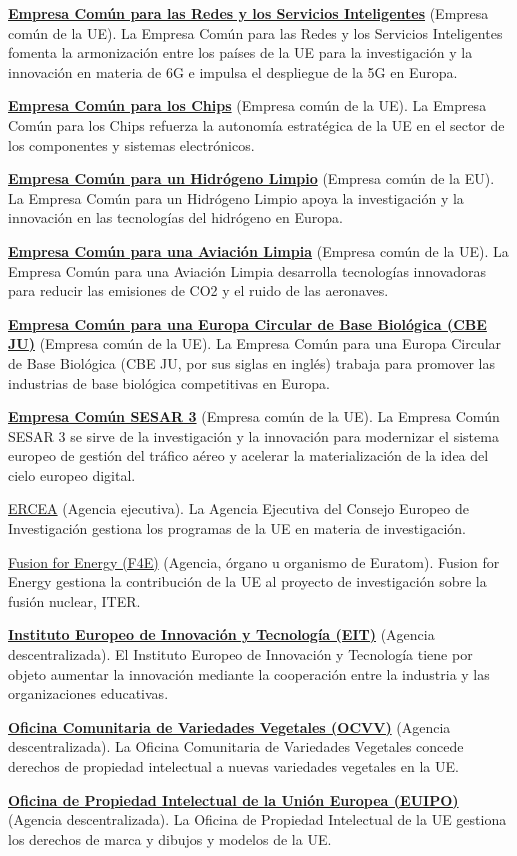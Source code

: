 \documentclass[10pt,a4paper]{article}
\begin{document}
\href{https://smart-networks.europa.eu/}{\textbf{Empresa Común para las Redes y los Servicios Inteligentes}} (Empresa común de la UE). La Empresa Común para las Redes y los Servicios Inteligentes fomenta la armonización entre los países de la UE para la investigación y la innovación en materia de 6G e impulsa el despliegue de la 5G en Europa.

\href{https://www.chips-ju.europa.eu/}{\textbf{Empresa Común para los Chips}} (Empresa común de la UE). La Empresa Común para los Chips refuerza la autonomía estratégica de la UE en el sector de los componentes y sistemas electrónicos.

\href{https://www.clean-hydrogen.europa.eu/index_en}{\textbf{Empresa Común para un Hidrógeno Limpio}} (Empresa común de la EU). La Empresa Común para un Hidrógeno Limpio apoya la investigación y la innovación en las tecnologías del hidrógeno en Europa.

\href{https://www.clean-aviation.eu/}{\textbf{Empresa Común para una Aviación Limpia}} (Empresa común de la UE). La Empresa Común para una Aviación Limpia desarrolla tecnologías innovadoras para reducir las emisiones de CO2 y el ruido de las aeronaves.

\href{https://www.cbe.europa.eu}{\textbf{Empresa Común para una Europa Circular de Base Biológica (CBE JU)}} (Empresa común de la UE). La Empresa Común para una Europa Circular de Base Biológica (CBE JU, por sus siglas en inglés) trabaja para promover las industrias de base biológica competitivas en Europa.

\href{https://www.sesarju.eu/}{\textbf{Empresa Común SESAR 3}} (Empresa común de la UE). La Empresa Común SESAR 3 se sirve de la investigación y la innovación para modernizar el sistema europeo de gestión del tráfico aéreo y acelerar la materialización de la idea del cielo europeo digital.

\href{https://ec.europa.eu/info/departments/european-research-council_es}{ERCEA} (Agencia ejecutiva). La Agencia Ejecutiva del Consejo Europeo de Investigación gestiona los programas de la UE en materia de investigación.

\href{https://fusionforenergy.europa.eu/}{Fusion for Energy (F4E)} (Agencia, órgano u organismo de Euratom). Fusion for Energy gestiona la contribución de la UE al proyecto de investigación sobre la fusión nuclear, ITER.

\href{https://eit.europa.eu/}{\textbf{Instituto Europeo de Innovación y Tecnología (EIT)}} (Agencia descentralizada). El Instituto Europeo de Innovación y Tecnología tiene por objeto aumentar la innovación mediante la cooperación entre la industria y las organizaciones educativas.

\href{https://cpvo.europa.eu/en/}{\textbf{Oficina Comunitaria de Variedades Vegetales (OCVV)}} (Agencia descentralizada). La Oficina Comunitaria de Variedades Vegetales concede derechos de propiedad intelectual a nuevas variedades vegetales en la UE.

\href{https://www.euipo.europa.eu/es/}{\textbf{Oficina de Propiedad Intelectual de la Unión Europea (EUIPO)}} (Agencia descentralizada). La Oficina de Propiedad Intelectual de la UE gestiona los derechos de marca y dibujos y modelos de la UE.
\end{document}
